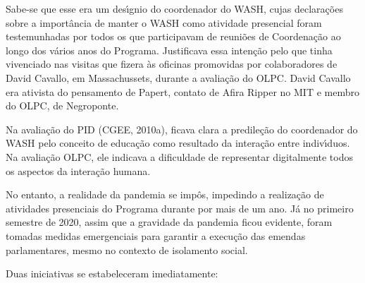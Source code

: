 \documentclass[
12pt,		%
openright,	%
twoside,  %
a4paper,			%
chapter=TITLE,		%
english,			%
french,				%
spanish,			%
brazil				%
]{USPSC-classe/USPSC}
\begin{document}
Sabe-se que esse era um des\'{\i}gnio do coordenador do WASH, cujas declara\c{c}\~oes sobre a import\^ancia de manter o WASH como atividade presencial foram testemunhadas por todos os que participavam de reuni\~oes de Coordena\c{c}\~ao ao longo dos v\'arios anos do Programa. Justificava essa inten\c{c}\~ao pelo que tinha vivenciado nas visitas que fizera \`as oficinas promovidas por colaboradores de David Cavallo, em Massachussets, durante a avalia\c{c}\~ao do OLPC. David Cavallo era ativista do pensamento de Papert, contato de Afira Ripper no MIT e membro do OLPC, de Negroponte.

















Na avalia\c{c}\~ao do PID (CGEE, 2010a), ficava clara a predile\c{c}\~ao do coordenador do WASH pelo conceito de educa\c{c}\~ao como resultado da intera\c{c}\~ao entre indiv\'{\i}duos. Na avalia\c{c}\~ao OLPC, ele indicava a dificuldade de representar digitalmente todos os aspectos da intera\c{c}\~ao humana.

















No entanto, a realidade da pandemia se imp\^os, impedindo a realiza\c{c}\~ao de atividades presenciais do Programa durante por mais de um ano. J\'a no primeiro semestre de 2020, assim que a gravidade da pandemia ficou evidente, foram tomadas medidas emergenciais para garantir a execu\c{c}\~ao das emendas parlamentares, mesmo no contexto de isolamento social.

















Duas iniciativas se estabeleceram imediatamente:
\end{document}
